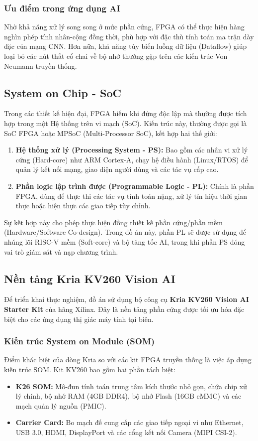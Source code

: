 \subsubsection{Ưu điểm trong ứng dụng AI}
Nhờ khả năng xử lý song song ở mức phần cứng, FPGA có thể thực hiện hàng nghìn phép tính nhân-cộng đồng thời, phù hợp với đặc thù tính toán ma trận dày đặc của mạng CNN. Hơn nữa, khả năng tùy biến luồng dữ liệu (Dataflow) giúp loại bỏ các nút thắt cổ chai về bộ nhớ thường gặp trên các kiến trúc Von Neumann truyền thống.

\subsection{System on Chip - SoC}
Trong các thiết kế hiện đại, FPGA hiếm khi đứng độc lập mà thường được tích hợp trong một Hệ thống trên vi mạch (SoC). Kiến trúc này, thường được gọi là SoC FPGA hoặc MPSoC (Multi-Processor SoC), kết hợp hai thế giới:

\begin{enumerate}
    \item \textbf{Hệ thống xử lý (Processing System - PS):} Bao gồm các nhân vi xử lý cứng (Hard-core) như ARM Cortex-A, chạy hệ điều hành (Linux/RTOS) để quản lý kết nối mạng, giao diện người dùng và các tác vụ cấp cao.
    \item \textbf{Phần logic lập trình được (Programmable Logic - PL):} Chính là phần FPGA, dùng để thực thi các tác vụ tính toán nặng, xử lý tín hiệu thời gian thực hoặc hiện thực các giao tiếp tùy chỉnh.
\end{enumerate}

Sự kết hợp này cho phép thực hiện đồng thiết kế phần cứng/phần mềm (Hardware/Software Co-design). Trong đồ án này, phần PL sẽ được sử dụng để nhúng lõi RISC-V mềm (Soft-core) và bộ tăng tốc AI, trong khi phần PS đóng vai trò giám sát và nạp chương trình.

\subsection{Nền tảng Kria KV260 Vision AI}
Để triển khai thực nghiệm, đồ án sử dụng bộ công cụ \textbf{Kria KV260 Vision AI Starter Kit} của hãng Xilinx. Đây là nền tảng phần cứng được tối ưu hóa đặc biệt cho các ứng dụng thị giác máy tính tại biên.

\subsubsection{Kiến trúc System on Module (SOM)}
Điểm khác biệt của dòng Kria so với các kit FPGA truyền thống là việc áp dụng kiến trúc SOM. Kit KV260 bao gồm hai phần tách biệt:
\begin{itemize}
    \item \textbf{K26 SOM:} Mô-đun tính toán trung tâm kích thước nhỏ gọn, chứa chip xử lý chính, bộ nhớ RAM (4GB DDR4), bộ nhớ Flash (16GB eMMC) và các mạch quản lý nguồn (PMIC).
    \item \textbf{Carrier Card:} Bo mạch đế cung cấp các giao tiếp ngoại vi như Ethernet, USB 3.0, HDMI, DisplayPort và các cổng kết nối Camera (MIPI CSI-2).
\end{itemize}

